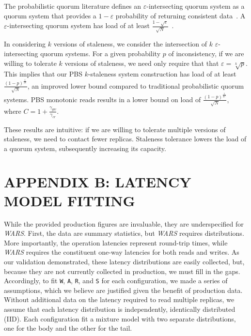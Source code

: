 \documentclass{vldb}
\begin{document}
The probabilistic quorum literature defines an
$\varepsilon$-intersecting quorum system as a quorum system that
provides a $1-\varepsilon$ probability of returning consistent
data~\cite[Definition 3.1]{prob-quorum}.  A $\varepsilon$-intersecting
quorum system has load of at least 
$\frac{1-\sqrt{\varepsilon}}{\sqrt{N}}$~\cite[Corollary
  3.12]{prob-quorum}.

In considering $k$ versions of staleness, we consider the intersection
of $k$ $\varepsilon$-intersecting quorum systems.  For a given
probability $p$ of inconsistency, if we are willing to tolerate $k$
versions of staleness, we need only require that that $\varepsilon =
\sqrt[k]{p}$.  This implies that our PBS $k$-staleness system
construction has load of at least
$\frac{(1-p)^{\frac{1}{2k}}}{\sqrt{N}}$, an improved lower bound
compared to traditional probabilistic quorum systems.  PBS monotonic
reads results in a lower bound on load of
$\frac{(1-p)^{\frac{1}{2C}}}{\sqrt{N}}$, where
$C=1+\frac{\gamma_{gw}}{\gamma_{cr}}$.

These results are intuitive: if we are willing to tolerate multiple
versions of staleness, we need to contact fewer replicas.  Staleness
tolerance lowers the load of a quorum system, subsequently increasing
its capacity.


\section*{APPENDIX B: LATENCY MODEL FITTING}

While the provided production figures are invaluable, they are
underspecified for \textit{WARS}.  First, the data are summary
statistics, but \textit{WARS} requires distributions.  More
importantly, the operation latencies represent round-trip times, while
\textit{WARS} requires the constituent one-way latencies for both
reads and writes.  As our validation demonstrated, these latency
distributions are easily collected, but, because they are not
currently collected in production, we must fill in the
gaps. Accordingly, to fit \texttt{W}, \texttt{A}, \texttt{R}, and
\texttt{S} for each configuration, we made a series of assumptions,
which we believe are justified given the benefit of production data.
Without additional data on the latency required to read multiple
replicas, we assume that each latency distribution is independently,
identically distributed (IID).  Each configuration fit a mixture model
with two separate distributions, one for the body and the other for
the tail.
\end{document}
